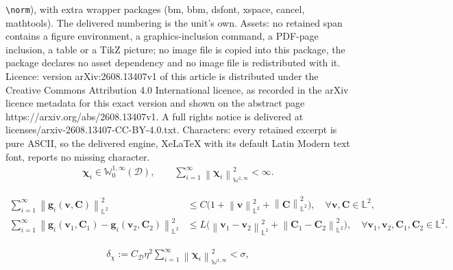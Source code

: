 \documentclass[10pt,a4paper]{amsart}
\newcommand{\bb}{\mathbb}
\newcommand{\bff}{\boldsymbol}
\newcommand{\norm}[2]{\left\|{#1}\right\|_{#2}}
\begin{document}
\texttt{\textbackslash norm}), with extra wrapper packages (bm, bbm, dsfont, xspace, cancel, mathtools). The delivered numbering is the unit's own. Assets: no retained span contains a figure environment, a graphics-inclusion command, a PDF-page inclusion, a table or a TikZ picture; no image file is copied into this package, the package declares no asset dependency and no image file is redistributed with it. Licence: version arXiv:2608.13407v1 of this article is distributed under the Creative Commons Attribution 4.0 International licence, as recorded in the arXiv licence metadata for this exact version and shown on the abstract page https://arxiv.org/abs/2608.13407v1. A full rights notice is delivered at licenses/arxiv-2608.13407-CC-BY-4.0.txt. Characters: every retained excerpt is pure ASCII, so the delivered engine, XeLaTeX with its default Latin Modern text font, reports no missing character.
\begin{align}\label{equ:chi assumption}
	\bff{\chi}_i\in \bb{W}^{1,\infty}_0(\mathscr{D}),\qquad
	\sum_{i=1}^\infty \norm{\bff{\chi}_i}{\bb{W}^{1,\infty}}^2<\infty.
\end{align}

\begin{align}
	\label{equ:g growth}
	\sum_{i=1}^\infty \norm{\bff{g}_i(\bff{v},\bff{C})}{\bb{L}^2}^2
	&\leq
	C\bigl(1+\norm{\bff{v}}{\bb{L}^2}^2+\norm{\bff{C}}{\bb{L}^2}^2\bigr), \quad \forall \bff{v},\bff{C}\in \bb{L}^2,
	\\
	\label{equ:g lipschitz}
	\sum_{i=1}^\infty \norm{\bff{g}_i(\bff{v}_1,\bff{C}_1)-\bff{g}_i(\bff{v}_2,\bff{C}_2)}{\bb{L}^2}^2
	&\leq
	L\bigl(\norm{\bff{v}_1-\bff{v}_2}{\bb{L}^2}^2+\norm{\bff{C}_1-\bff{C}_2}{\bb{L}^2}^2\bigr),
	\quad \forall \bff{v}_1,\bff{v}_2,\bff{C}_1,\bff{C}_2\in \bb{L}^2.
\end{align}

\begin{align}\label{equ:hall noise small}
	\delta_\chi:=C_{\mathscr{D}}\eta^2\sum_{i=1}^\infty \norm{\bff{\chi}_i}{\bb{W}^{1,\infty}}^2<\sigma,
\end{align}
\end{document}
